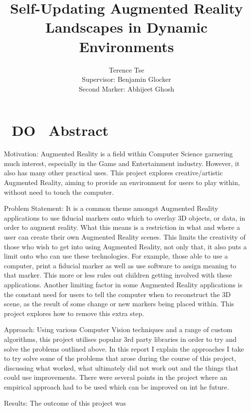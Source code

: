 \documentclass[11pt]{article}
\begin{document}
\title{Self-Updating Augmented Reality Landscapes in Dynamic Environments}
\author{Terence Tse \\
		Supervisor: Benjamin Glocker\\
		Second Marker: Abhijeet Ghosh}
\maketitle

\newpage
\section*{~DO~ Abstract}
Motivation:
Augmented Reality is a field within Computer Science garnering much 
interest, especially in the Game and Entertainment industry. However, 
it also has many other practical uses. This project explores 
creative/artistic Augmented Reality, aiming to provide an 
environment for users to play within, without need to touch the computer.

Problem Statement:
It is a common theme amongst Augmented Reality applications to use 
fiducial markers onto which to overlay 3D objects, or data, in 
order to augment reality. What this means is a restriction in 
what and where a user can create their own Augmented Reality scenes. 
This limits the creativity of those who wish to get into using 
Augmented Reality, not only that, it also puts a limit onto 
who can use these technologies. For example, those able to use a 
computer, print a fiducial marker as well as use software to assign
meaning to that marker. This more or less rules out children getting 
involved with these applications. Another limiting factor in some 
Augmented Reality applications is the constant need for users to tell 
the computer when to reconstruct the 3D scene, as the result of some 
change or new markers being placed within. This project explores how 
to remove this extra step.

Approach:
Using various Computer Vision techniques and a range of custom 
algorithms, this project utilises popular 3rd party libraries
in order to try and solve the problems outlined above. In this 
report I explain the approaches I take to try solve some of 
the problems that arose during the course of this project, 
discussing what worked, what ultimately did not work out and 
the things that could use improvements. There were several points 
in the project where an empirical approach had to be used which 
can be improved on int he future.

Results:
The outcome of this project was
\end{document}
